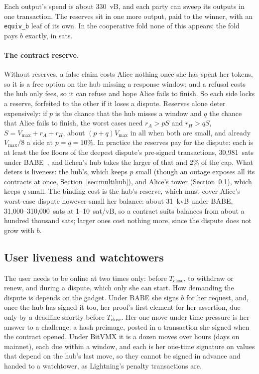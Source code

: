\documentclass[11pt]{article}
\newcommand{\vmax}{V_{\max}}
\newcommand{\Tc}{T_{\mathrm{close}}}
\newcommand{\tx}[1]{\texttt{#1}}
\begin{document}
Each output's spend is about 330~vB, and each party can sweep its
outputs in one transaction. The reserves sit in one more output, paid
to the winner, with an \tx{equiv\_b} leaf of its own. In the cooperative
fold none of this appears: the fold pays $b$ exactly, in sats.

\paragraph{The contract reserve.} Without reserves, a false claim costs
Alice nothing once she has spent her tokens, so it is a free option on
the hub missing a response window; and a refusal costs the hub only
fees, so it can refuse and hope Alice fails to finish. So each side
locks a reserve, forfeited to the other if it loses a dispute. Reserves
alone deter expensively: if $p$ is the chance that the hub misses a
window and $q$ the chance that Alice fails to finish, the worst cases
need $r_A > pS$ and $r_H > qS$, $S = \vmax + r_A + r_H$, about
$(p + q)\vmax$ in all when both are small, and already $\vmax/8$ a side
at $p = q = 10\%$. In practice the reserves pay for the dispute: each is
at least the fee floors of the deepest dispute's pre-signed
transactions, 30,981~sats under BABE~\cite[\S 9]{lichenbuilt}, and
lichen's hub takes the larger of that and 2\% of the cap. What deters is
liveness: the hub's, which keeps $p$ small (though an outage exposes all
its contracts at once, Section~\ref{sec:multihub}), and Alice's tower
(Section~\ref{sec:watch}), which keeps $q$ small. The binding cost is
the hub's reserve, which must cover Alice's worst-case dispute however
small her balance: about 31~kvB under BABE, 31,000--310,000~sats at
1--10~sat/vB, so a contract suits balances from about a hundred thousand
sats; larger ones cost nothing more, since the dispute does not grow
with $b$.

\subsection{User liveness and watchtowers}
\label{sec:watch}

The user needs to be online at two times only: before $\Tc$, to withdraw or
renew, and during a dispute, which only she can start. How demanding the
dispute is depends on the gadget. Under BABE she signs $b$ for her
request, and, once the hub has signed it too, her proof's first element
for her assertion, due only by a deadline shortly before $\Tc$. Her one
move under time pressure is her answer to a challenge: a hash preimage,
posted in a transaction she signed when the contract opened. Under
BitVMX it is a dozen moves over hours (days on mainnet), each due within
a window, and each is her one-time signature on values that depend on
the hub's last move, so they cannot be signed in advance and handed to a
watchtower, as Lightning's penalty transactions are.
\end{document}
